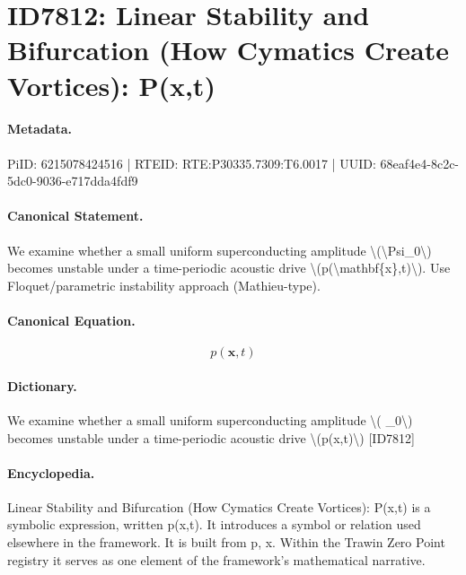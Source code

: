 \section*{ID7812: Linear Stability and Bifurcation (How Cymatics Create Vortices): P(x,t)}
\paragraph{Metadata.}
PiID: 6215078424516 | RTEID: RTE:P30335.7309:T6.0017 | UUID: 68eaf4e4-8c2c-5dc0-9036-e717dda4fdf9

\paragraph{Canonical Statement.}
We examine whether a small uniform superconducting amplitude \textbackslash{}(\textbackslash{}Psi\_0\textbackslash{}) becomes unstable under a time-periodic acoustic drive \textbackslash{}(p(\textbackslash{}mathbf\{x\},t)\textbackslash{}). Use Floquet/parametric instability approach (Mathieu-type).

\paragraph{Canonical Equation.}
\[
p(\mathbf{x},t)
\]

\paragraph{Dictionary.}
We examine whether a small uniform superconducting amplitude \textbackslash{}( \_0\textbackslash{}) becomes unstable under a time-periodic acoustic drive \textbackslash{}(p(x,t)\textbackslash{}) [ID7812]

\paragraph{Encyclopedia.}
Linear Stability and Bifurcation (How Cymatics Create Vortices): P(x,t) is a symbolic expression, written p(x,t). It introduces a symbol or relation used elsewhere in the framework. It is built from p, x. Within the Trawin Zero Point registry it serves as one element of the framework's mathematical narrative.
